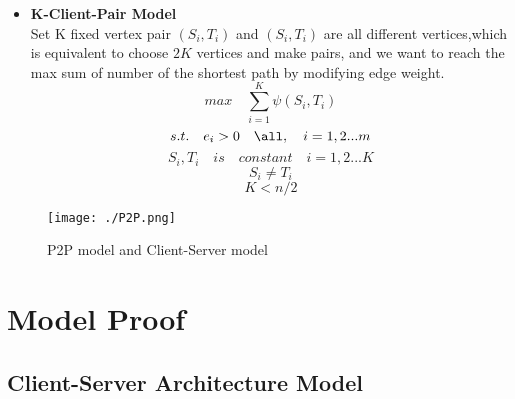 \documentclass{elegantpaper}
\begin{document}
 \begin{itemize}[noitemsep]\item\textbf{K-Client-Pair Model}\\
Set K fixed vertex pair $(S_i,T_i)$ and  $(S_i,T_i)$ are all different vertices,which is equivalent to choose $2K$ vertices and make pairs, and we want to reach the max sum of number of the shortest path by modifying edge weight.
 $$max \quad \sum_{i=1}^{K} \psi(S_i,T_i) $$
 $$s.t. \quad e_i > 0 \quad \all,\quad i = 1,2...m$$
 $$S_i,T_i \quad is\quad  constant \quad i=1,2...K$$
 $$S_i \ne T_i$$
  $$K < n/2$$
 \end{itemize}
 \begin{figure}[htbp]
	
	\centering
	
	\texttt{[image: ./P2P.png]}
	
	\caption{P2P model and Client-Server model}
	
\end{figure}
 
 \section{Model Proof}
\subsection{Client-Server Architecture Model}
\end{document}
